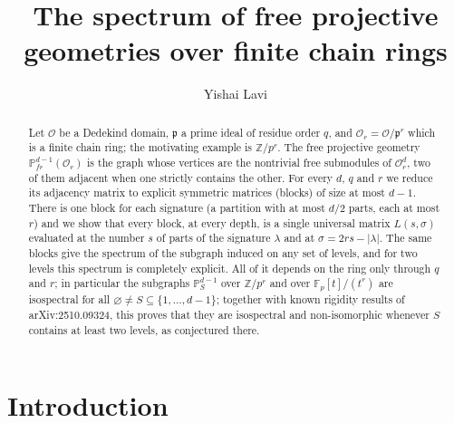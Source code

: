 \documentclass[11pt]{article}
\title{The spectrum of free projective geometries over finite chain rings}
\author{Yishai Lavi}
\date{}
\numberwithin{equation}{section}
\theoremstyle{plain}
\theoremstyle{definition}
\begin{document}
\maketitle

\begin{abstract}
Let $\mathcal{O}$ be a Dedekind domain, $\mathfrak{p}$ a prime ideal of
residue order $q$, and $\mathcal{O}_r=\mathcal{O}/\mathfrak{p}^r$ which is a finite chain ring; the motivating example
is $\mathbb{Z}/p^r$. The free projective geometry $\mathbb{P}^{d-1}_{fr}(\mathcal{O}_r)$ is
the graph whose vertices are the nontrivial free submodules of $\mathcal{O}_r^{d}$,
two of them adjacent when one strictly contains the other. For every $d$, $q$ and $r$
we reduce its adjacency matrix to explicit symmetric matrices (blocks) of size
at most $d-1$. There is one block for each signature (a partition with at most $d/2$ parts, each at most
$r$) and we show that every block, at every depth, is a single universal matrix
$L(s,\sigma)$ evaluated at the number $s$ of parts of the signature $\lambda$ and
at $\sigma=2rs-|\lambda|$. The same blocks give the spectrum of the subgraph induced
on any set of levels, and for two levels this spectrum is completely explicit. All of
it depends on the ring only through $q$ and $r$; in particular the subgraphs
$\mathbb{P}^{d-1}_{S}$ over $\mathbb{Z}/p^r$ and over $\mathbb{F}_p[t]/(t^r)$ are
isospectral for all $\varnothing\ne S\subseteq\{1,\dots,d-1\}$; together with known
rigidity results of arXiv:2510.09324, this proves that they are isospectral and non-isomorphic whenever $S$ contains
at least two levels, as conjectured there.
\end{abstract}

\section{Introduction}\label{sec:1}
\end{document}
